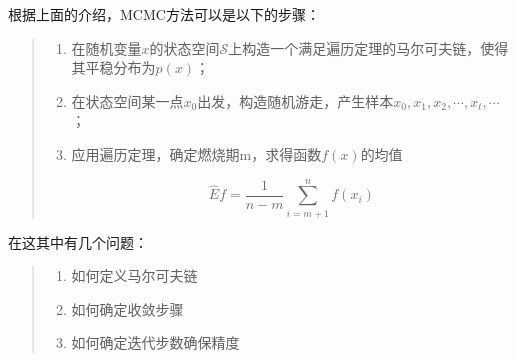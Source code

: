 根据上面的介绍，MCMC方法可以是以下的步骤：

\begin{quote}
\begin{enumerate}
\def\labelenumi{\arabic{enumi}.}
\item
  在随机变量\(x\)的状态空间\(\mathcal{S}\)上构造一个满足遍历定理的马尔可夫链，使得其平稳分布为\(p(x)\)；
\item
  在状态空间某一点\(x_0\)出发，构造随机游走，产生样本\(x_0,x_1,x_2,\cdots,x_t,\cdots\)；
\item
  应用遍历定理，确定燃烧期m，求得函数\(f(x)\)的均值

  \[\hat{E}f=\frac{1}{n-m}\sum_{i=m+1}^{n}f(x_i)\]
\end{enumerate}
\end{quote}

在这其中有几个问题：

\begin{quote}
\begin{enumerate}
\def\labelenumi{\arabic{enumi}.}
\item
  如何定义马尔可夫链
\item
  如何确定收敛步骤
\item
  如何确定迭代步数确保精度
\end{enumerate}
\end{quote}
